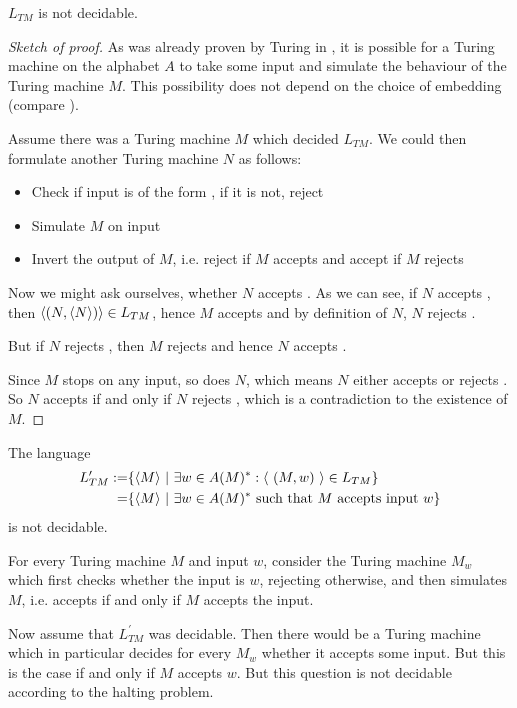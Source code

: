 \begin{Theorem}
	$L_{TM}$ is not decidable.\footnotemark
\end{Theorem}
\begin{proof}[Sketch of proof]
	As was already proven by Turing in \cite{tur36}, it is possible for a Turing machine on the alphabet $A$ to take some input  and simulate the behaviour of the Turing machine $M$.
	This possibility does not depend on the choice of embedding (compare \cite{sip06}).

	Assume there was a Turing machine $M$ which decided $L_{TM}$.
	We could then formulate another Turing machine $N$ as follows:
	\begin{itemize}
		\item Check if input is of the form , if it is not, reject
		\item Simulate $M$ on input 
		\item Invert the output of $M$, i.e. reject if $M$ accepts and accept if $M$ rejects
	\end{itemize}

	Now we might ask ourselves, whether $N$ accepts .
	As we can see, if $N$ accepts , then $\langle (N,\langle N \rangle) \rangle \in L_{TM}$, hence $M$ accepts  and by definition of $N$, $N$ rejects .
	
	But if $N$ rejects , then $M$ rejects  and hence $N$ accepts .

	Since $M$ stops on any input, so does $N$, which means $N$ either accepts or rejects .
	So $N$ accepts  if and only if $N$ rejects , which is a contradiction to the existence of $M$.
\end{proof}

\begin{Corollary}
	\label{halting_problem:undecidability:halting_corollary}
	The language
	\begin{align*}
		L_{TM}^\prime
		:=& \{ \langle M \rangle ~|~ \exists w \in A(M)^*: \langle ~(M,w)~ \rangle \in L_{TM} \} \\
		=& \{ \langle M \rangle ~|~ \exists w \in A(M)^* ~\text{such that $M$ accepts input $w$} \}
	\end{align*}
	is not decidable.
\end{Corollary}
\proof
	For every Turing machine $M$ and input $w$, consider the Turing machine $M_w$ which first checks whether the input is $w$, rejecting otherwise, and then simulates $M$, i.e. accepts if and only if $M$ accepts the input.

	Now assume that $L_{TM}^\prime$ was decidable. Then there would be a Turing machine which in particular decides for every $M_w$ whether it accepts some input. But this is the case if and only if $M$ accepts $w$. But this question is not decidable according to the halting problem.
\endproof
